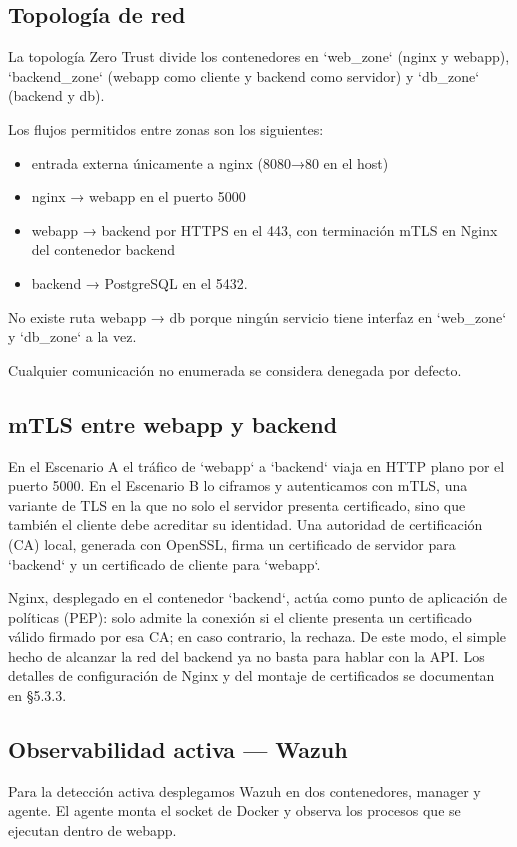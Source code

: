 \documentclass[11pt,spanish,listoffigures,listoftables]{tfgetsinf}
\begin{document}
        \subsection{Topología de red}
        La topología Zero Trust divide los contenedores en `web\_zone` (nginx y webapp), `backend\_zone` (webapp como cliente y backend como servidor) y `db\_zone` (backend y db). 
        
        Los flujos permitidos entre zonas son los siguientes:
        \begin{itemize}
            \item entrada externa únicamente a nginx (8080→80 en el host)
            \item nginx → webapp en el puerto 5000
            \item webapp → backend por HTTPS en el 443, con terminación mTLS en Nginx del contenedor backend
            \item backend → PostgreSQL en el 5432. 
        \end{itemize}
        No existe ruta webapp → db porque ningún servicio tiene interfaz en `web\_zone` y `db\_zone` a la vez.
        
        Cualquier comunicación no enumerada se considera denegada por defecto.
        
        \subsection{mTLS entre webapp y backend}
        En el Escenario A el tráfico de `webapp` a `backend` viaja en HTTP plano por el puerto 5000. En el Escenario B lo ciframos y autenticamos con mTLS, una variante de TLS en la que no solo el servidor presenta certificado, sino que también el cliente debe acreditar su identidad. Una autoridad de certificación (CA) local, generada con OpenSSL, firma un certificado de servidor para `backend` y un certificado de cliente para `webapp`.
        
        Nginx, desplegado en el contenedor `backend`, actúa como punto de aplicación de políticas (PEP): solo admite la conexión si el cliente presenta un certificado válido firmado por esa CA; en caso contrario, la rechaza. De este modo, el simple hecho de alcanzar la red del backend ya no basta para hablar con la API. Los detalles de configuración de Nginx y del montaje de certificados se documentan en §5.3.3.
        
        \subsection{Observabilidad activa — Wazuh}
        Para la detección activa desplegamos Wazuh en dos contenedores, manager y agente. El agente monta el socket de Docker y observa los procesos que se ejecutan dentro de webapp.
\end{document}
